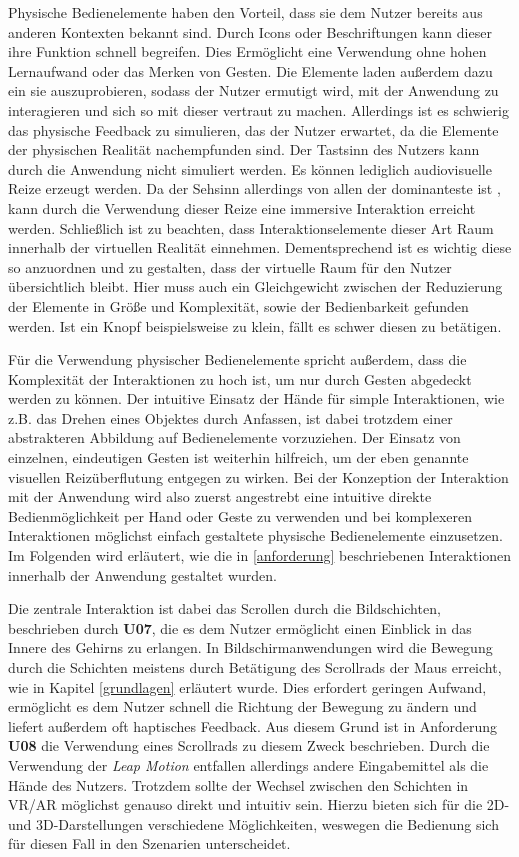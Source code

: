 Physische Bedienelemente haben den Vorteil, dass sie dem Nutzer bereits aus anderen Kontexten bekannt sind. Durch Icons oder Beschriftungen kann dieser ihre Funktion schnell begreifen. 
 Dies Ermöglicht eine Verwendung ohne hohen Lernaufwand oder das Merken von Gesten. 
Die Elemente laden außerdem dazu ein sie auszuprobieren, sodass der Nutzer ermutigt wird, mit der Anwendung zu interagieren und sich so mit dieser vertraut zu machen. 
Allerdings ist es schwierig das physische Feedback zu simulieren, das der Nutzer erwartet, da die Elemente der physischen Realität nachempfunden sind. Der Tastsinn des Nutzers kann durch die Anwendung nicht simuliert werden. Es können lediglich audiovisuelle Reize erzeugt werden. Da der Sehsinn allerdings von allen der dominanteste ist \cite{Azmandian16}, kann durch die Verwendung dieser Reize eine immersive Interaktion erreicht werden. 
Schließlich ist zu beachten, dass Interaktionselemente dieser Art Raum innerhalb der virtuellen Realität einnehmen. Dementsprechend ist es wichtig diese so anzuordnen und zu gestalten, dass der virtuelle Raum für den Nutzer übersichtlich bleibt. Hier muss auch ein Gleichgewicht zwischen der Reduzierung der Elemente in Größe und Komplexität, sowie der Bedienbarkeit gefunden werden. Ist ein Knopf beispielsweise zu klein, fällt es schwer diesen zu betätigen. 

Für die Verwendung physischer Bedienelemente spricht außerdem, dass die Komplexität der Interaktionen zu hoch ist, um nur durch Gesten abgedeckt werden zu können. Der intuitive Einsatz der Hände für simple Interaktionen, wie z.B. das Drehen eines Objektes durch Anfassen, ist dabei trotzdem einer abstrakteren Abbildung auf Bedienelemente vorzuziehen. Der Einsatz von einzelnen, eindeutigen Gesten ist weiterhin hilfreich, um der eben genannte visuellen Reizüberflutung entgegen zu wirken. 
Bei der Konzeption der Interaktion mit der Anwendung wird also zuerst angestrebt eine intuitive direkte Bedienmöglichkeit per Hand oder Geste zu verwenden und bei komplexeren Interaktionen möglichst einfach gestaltete physische Bedienelemente einzusetzen.
Im Folgenden wird erläutert, wie die in \ref{anforderung} beschriebenen Interaktionen innerhalb der Anwendung gestaltet wurden.

Die zentrale Interaktion ist dabei das Scrollen durch die Bildschichten, beschrieben durch \textbf{U07}, die es dem Nutzer ermöglicht einen Einblick in das Innere des Gehirns zu erlangen. In Bildschirmanwendungen wird die Bewegung durch die Schichten meistens durch Betätigung des Scrollrads der Maus erreicht, wie in Kapitel \ref{grundlagen} erläutert wurde.
Dies erfordert geringen Aufwand, ermöglicht es dem Nutzer schnell die Richtung der Bewegung zu ändern und liefert außerdem oft haptisches Feedback. 
Aus diesem Grund ist in Anforderung \textbf{U08} die Verwendung eines Scrollrads zu diesem Zweck beschrieben. Durch die Verwendung der \textit{Leap Motion} entfallen allerdings andere Eingabemittel als die Hände des Nutzers.
Trotzdem sollte der Wechsel zwischen den Schichten in VR/AR möglichst genauso direkt und intuitiv sein. 
Hierzu bieten sich für die 2D- und 3D-Darstellungen verschiedene Möglichkeiten, weswegen die Bedienung sich für diesen Fall in den Szenarien unterscheidet. 

